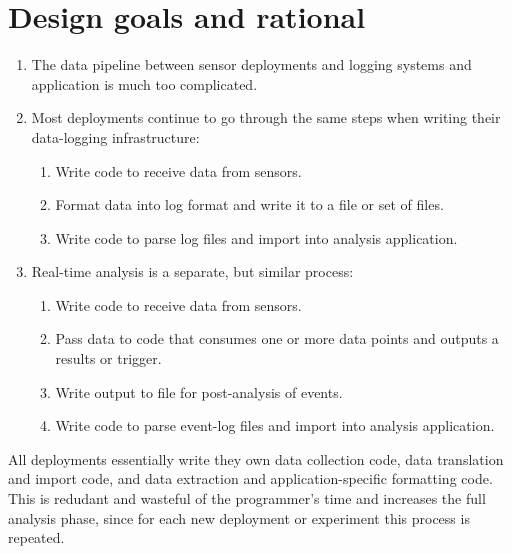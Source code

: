 \section{Design goals and rational}



\begin{enumerate}
\item The data pipeline between sensor deployments and logging systems and application is much too complicated.
\item Most deployments continue to go through the same steps when writing their data-logging infrastructure:
	\begin{enumerate}
	\item Write code to receive data from sensors.
	\item Format data into log format and write it to a file or set of files.
	\item Write code to parse log files and import into analysis application.
	\end{enumerate}
\item Real-time analysis is a separate, but similar process:
	\begin{enumerate}
	\item Write code to receive data from sensors.
	\item Pass data to code that consumes one or more data points and outputs a results or trigger.
	\item Write output to file for post-analysis of events.
	\item Write code to parse event-log files and import into analysis application.
	\end{enumerate}
\end{enumerate}

All deployments essentially write they own data collection code, data translation and import code, and data extraction
and application-specific formatting code.  This is redudant and wasteful of the programmer's time and increases the full
analysis phase, since for each new deployment or experiment this process is repeated.

